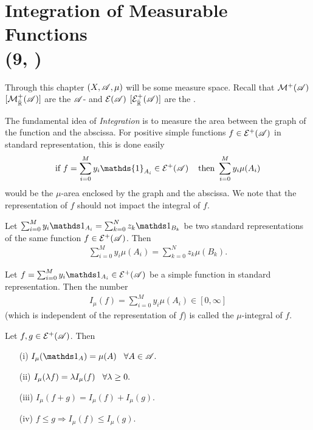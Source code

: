 \section{Integration of Measurable Functions \protect\\ \tiny{ (9, \cite{schilling2017measures})}}
Through this chapter $(X,\mathscr{A},\mu)$ will be some measure space. Recall that $\mathcal M^+(\mathscr{A})$
$[\mathcal M^+_{\bar{\mathbb{R}}}(\mathscr{A})]$ are the
$\mathscr{A}$- and $\mathcal E(\mathscr{A})$ $[\mathcal E^+_{\bar{\mathbb{R}}}(\mathscr{A})]$ are the .

The fundamental idea of \textit{Integration} is to measure the area between the graph
of the function and the abscissa. For positive simple functions $f\in\mathcal E^+(\mathscr{A})$ in standard 
representation, this is done easily
\begin{align}
    \text{if  } f=\sum_{i=0}^M y_i \mathds{1}_{A_i}\in \E^+(\A)\hspace{4mm} \text{then  } \sum_{i=0}^{M}y_i\mu(A_i)
\end{align}
would be the $\mu$-area enclosed by the graph and the abscissa. We note that 
the representation of $f$ should not impact the integral of $f$.

\begin{lemma}
    Let $\sum_{i=0}^{M} y_i\one_{A_i} =\sum_{k=0}^{N} z_k\one_{B_k} $ be two standard representations
    of the same function $f\in\mathcal{E}^+(\mathscr{A})$. Then 
    \begin{align}
        \sum_{i=0}^{M} y_i\mu(A_i) =\sum_{k=0}^{N} z_k\mu(B_k).
    \end{align}
\end{lemma}


\begin{definition}
    Let $f=\sum_{i=0}^{M} y_i\one_{A_i}\in\E^+(\A)$ be a simple function in standard representation.
    Then the number
    \begin{align}
    I_\mu(f) = \sum_{i=0}^{M} y_i\mu(A_i)\in[0,\infty]    
    \end{align}
    (which is independent of the representation of $f$) is called the $\mu$-integral of $f$.
\end{definition}

\begin{proposition}
    Let $f,g\in\mathcal{E}^+(\mathscr{A})$. Then
    \begin{enumerate}
        \item[(i)] $I_\mu(\one_A)=\mu(A)\hspace{3mm}\forall A\in\A.$
        \item[(ii)] $I_\mu(\lambda f)=\lambda I_\mu(f)\hspace{3mm} \forall \lambda\geq 0.$
        \item[(iii)] $I_\mu(f+g) = I_\mu(f)+I_\mu(g).$
        \item[(iv)]  $f\leq g\Rightarrow I_\mu(f)\leq I_\mu(g).$
    \end{enumerate}
\end{proposition}

